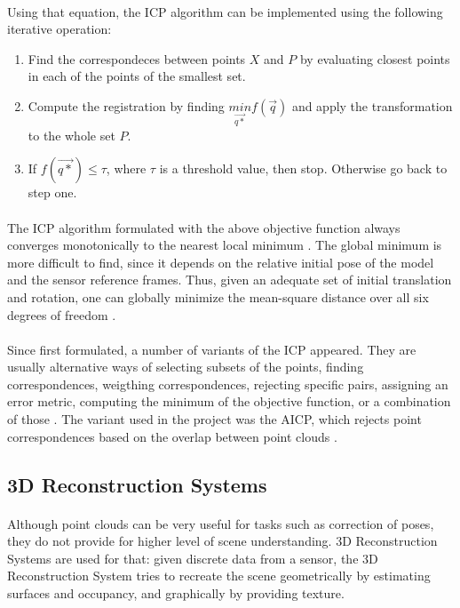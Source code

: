 \documentclass[11pt]{article}
\begin{document}
	\paragraph{}
	Using that equation, the ICP algorithm can be implemented using the following iterative operation:
	\begin{enumerate}[leftmargin=.8in]
		\item Find the correspondeces between points $X$ and $P$ by evaluating closest points in each of the points of the smallest set.
		\item Compute the registration by finding $\underset{\overrightarrow{q*}}{min}f(\overrightarrow{q})$ and apply the transformation to the whole set $P$.
		\item If $f(\overrightarrow{q*}) \leq \tau$, where $\tau$ is a threshold value, then stop. Otherwise go back to step one.
	\end{enumerate}	
	
	\paragraph{}
	The ICP algorithm formulated with the above objective function always converges monotonically to the nearest local minimum \cite{AMethodRegistration}. The global minimum is more difficult to find, since it depends on the relative initial pose of the model and the sensor reference frames. Thus, given an adequate set of initial translation and rotation, one can globally minimize the mean-square distance over all six degrees of freedom \cite{AMethodRegistration}.

	\paragraph{}
	Since first formulated, a number of variants of the ICP appeared. They are usually alternative ways of selecting subsets of the points, finding correspondences, weigthing correspondences, rejecting specific pairs, assigning an error metric, computing the minimum of the objective function, or a combination of those \cite{ICPVariants}. The variant used in the project was the AICP, which rejects point correspondences based on the overlap between point clouds \cite{7989547}.
	
	\subsection{3D Reconstruction Systems}
	\paragraph{}
	Although point clouds can be very useful for tasks such as correction of poses, they do not provide for higher level of scene understanding. 3D Reconstruction Systems are used for that: given discrete data from a sensor, the 3D Reconstruction System tries to recreate the scene geometrically by estimating surfaces and occupancy, and graphically by providing texture.
	
\end{document}
